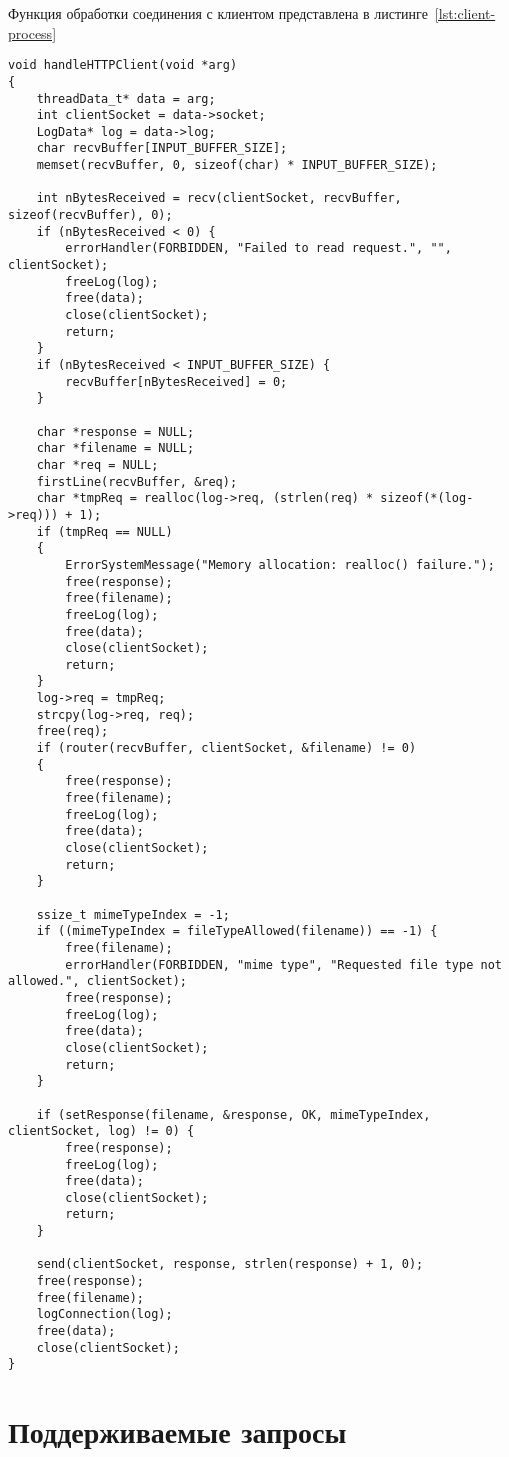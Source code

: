 Функция обработки соединения с клиентом представлена в листинге~\ref{lst:client-process}

\captionsetup{justification=raggedright,singlelinecheck=off}
\begin{lstlisting}[label=lst:client-process, caption=Обработка клиентского соединения]
void handleHTTPClient(void *arg)
{
	threadData_t* data = arg;
	int clientSocket = data->socket;
	LogData* log = data->log;
	char recvBuffer[INPUT_BUFFER_SIZE];
	memset(recvBuffer, 0, sizeof(char) * INPUT_BUFFER_SIZE);
	
	int nBytesReceived = recv(clientSocket, recvBuffer, sizeof(recvBuffer), 0);
	if (nBytesReceived < 0) {
		errorHandler(FORBIDDEN, "Failed to read request.", "", clientSocket);
		freeLog(log);
		free(data);
		close(clientSocket);
		return;	
	}
	if (nBytesReceived < INPUT_BUFFER_SIZE) {
		recvBuffer[nBytesReceived] = 0;
	} 
	
	char *response = NULL;
	char *filename = NULL;
	char *req = NULL;
	firstLine(recvBuffer, &req);
	char *tmpReq = realloc(log->req, (strlen(req) * sizeof(*(log->req))) + 1);
	if (tmpReq == NULL) 
	{
		ErrorSystemMessage("Memory allocation: realloc() failure.");
		free(response);
		free(filename);
		freeLog(log);
		free(data);
		close(clientSocket);
		return;	
	}
	log->req = tmpReq;
	strcpy(log->req, req);
	free(req);
	if (router(recvBuffer, clientSocket, &filename) != 0)
	{
		free(response);
		free(filename);
		freeLog(log);
		free(data);
		close(clientSocket);
		return;
	}
	
	ssize_t mimeTypeIndex = -1;
	if ((mimeTypeIndex = fileTypeAllowed(filename)) == -1) {
		free(filename);
		errorHandler(FORBIDDEN, "mime type", "Requested file type not allowed.", clientSocket);
		free(response);
		freeLog(log);
		free(data);
		close(clientSocket);
		return;
	}
	
	if (setResponse(filename, &response, OK, mimeTypeIndex, clientSocket, log) != 0) {
		free(response);
		freeLog(log);
		free(data);
		close(clientSocket);
		return;
	}
	
	send(clientSocket, response, strlen(response) + 1, 0);
	free(response);
	free(filename);
	logConnection(log);
	free(data);
	close(clientSocket);
}
\end{lstlisting}

\section{Поддерживаемые запросы}

